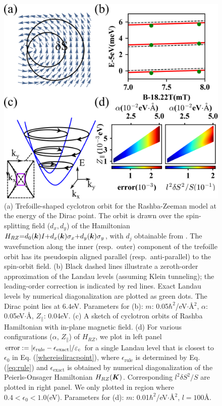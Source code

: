 \documentclass[aps, prb, showpacs, twocolumn, notitlepage, superscriptaddress]{revtex4-1}
\begin{document}
\begin{figure}
\includegraphics[width=1.0\columnwidth]{RZ.png}
\caption{(a) Trefoille-shaped cyclotron orbit for the Rashba-Zeeman model at the energy of the Dirac point. The orbit is drawn over the  spin-splitting field ($d_x,d_y$) of the Hamiltonian $H_{RZ}{=}d_0(\boldsymbol{k})I{+}d_x(\boldsymbol{k})\sigma_x{+}d_y(\boldsymbol{k})\sigma_y$, with $d_j$ obtainable from . The wavefunction along the inner (resp.\ outer) component of the trefoille orbit has its pseudospin aligned parallel (resp.\ anti-parallel) to the spin-orbit field. (b) Black dashed lines illustrate a zeroth-order approximation of the Landau levels (assuming Klein tunneling); the leading-order correction is indicated by red lines. Exact Landau levels by numerical diagonalization are plotted as green dots. The Dirac point lies at $6.4$eV. Parameters for (b): $m$: 0.05$\hbar^2$/eV$\cdot$\AA$^2$, $\alpha$: 0.05eV$\cdot$\AA, $Z_\parallel$: 0.04eV. (c) A sketch of cyclotron orbits of Rashba Hamiltonian with in-plane magnetic field. (d) For various configurations ($\alpha$, $Z_\parallel$) of $H_{RZ}$, we plot in left panel $\text{error}:=|\epsilon_\text{rule}-\epsilon_\text{exact}|/\varepsilon_c$ for a single Landau level that is closest to $\epsilon_0$ in Eq. (\ref{whereisdiracpoint}), where $\epsilon_\text{rule}$ is determined by Eq. (\ref{eq:rule}) and $\epsilon_{\text{exact}}$ is obtained by numerical diagonalization of the Peierls-Onsager Hamiltonian $H_{RZ}(\boldsymbol{K})$. Corresponding $l^2 \delta S^2/S$ are plotted in right panel. We only plotted in region where $0.4<\epsilon_0<1.0$(eV).\cite{RZfignote} Parameters for (d): $m$: 0.01$\hbar^2$/eV$\cdot$\AA$^2$, $l=100$\AA. \label{fig:RZ}}
\end{figure}
\end{document}

